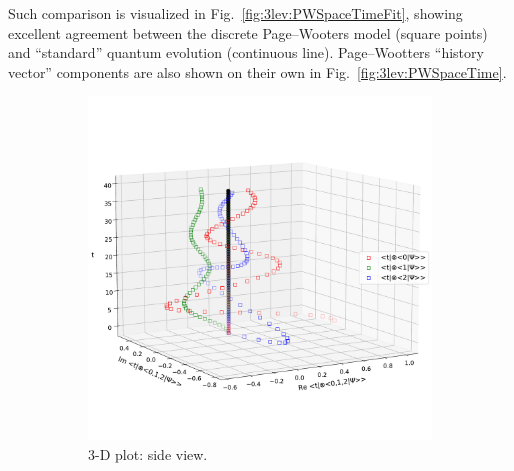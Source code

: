 Such comparison is visualized in Fig.~\ref{fig:3lev:PWSpaceTimeFit},
showing excellent agreement between the discrete Page--Wooters model (square points)
and ``standard'' quantum evolution (continuous line).
Page--Wootters ``history vector'' components are also shown on their own
in Fig.~\ref{fig:3lev:PWSpaceTime}. 

\begin{figure}[]
  \begin{subfigure}[b]{\textwidth}
    \centering
    \includegraphics[height=0.41\textheight,clip,trim=0 90 0 140]{img/3ldetect/PWSpaceTime_side.pdf}
    \caption{3-D plot: side view.}
  \end{subfigure}
  \par\bigskip
  \begin{subfigure}[b]{\textwidth}
    \centering

\end{subfigure}
\end{figure}
